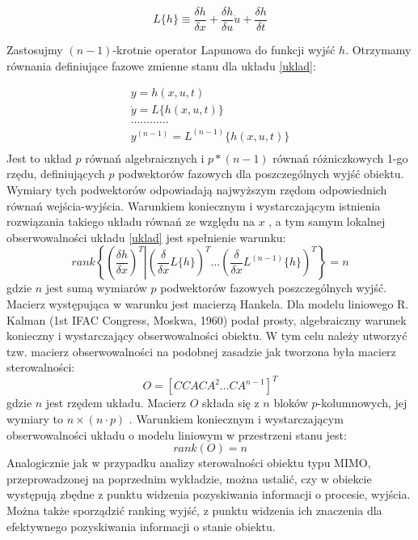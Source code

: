 \documentclass{article}
\begin{document}
		\begin{equation}
			L\{h\} \equiv \frac{\delta h}{\delta x} + \frac{\delta h}{\delta u} \dot{u} + \frac{\delta h}{\delta t}
		\end{equation}

		Zastosujmy $(n-1)$-krotnie operator Lapunowa do funkcji wyjść $h$.
		Otrzymamy równania definiujące fazowe zmienne stanu dla układu \ref{uklad}:

		\begin{align*}
			y = h(x,u,t) \\ 
			\dot{y} = L\{h(x,u,t)\} \\ 
			\ldots \ldots \ldots \ldots \\
			y^{(n-1)} = L^{(n-1)}\{h(x,u,t)\} \\ 
		\end{align*}
		Jest to układ $p$ równań algebraicznych i $p*(n-1)$ równań różniczkowych 1-go rzędu,
		definiujących $p$ podwektorów fazowych dla poszczególnych wyjść obiektu. Wymiary tych
		podwektorów odpowiadają najwyższym rzędom odpowiednich równań wejścia-wyjścia.
		Warunkiem koniecznym i wystarczającym istnienia rozwiązania takiego układu równań
		ze względu na $x$ , a tym samym lokalnej obserwowalności układu \eqref{uklad} jest spełnienie
		warunku:
		\begin{equation}
			rank  \left\{ \left(
			 \left. \frac{\delta h}{\delta x} \right)^T
			 \right\vert
			 \left( \frac{\delta }{\delta x} L\{h\} \right)^T 
			 \ldots 
			 \left( \frac{\delta }{\delta x} L^{(n-1)}\{h\} \right)^T
			 \right\} = n
		\end{equation}
		gdzie $n$ jest sumą wymiarów $p$ podwektorów fazowych poszczególnych wyjść. Macierz
		występująca w warunku jest macierzą Hankela.
		Dla modelu liniowego R. Kalman (1st IFAC Congress, Moskwa, 1960) podał prosty,
		algebraiczny warunek konieczny i wystarczający obserwowalności obiektu.
		W tym celu należy utworzyć tzw. macierz obserwowalności na podobnej zasadzie jak
		tworzona była macierz sterowalności:
		\begin{equation}
			O = [ C CA CA^2 \ldots CA^{n-1}]^T
		\end{equation}
		gdzie $n$ jest rzędem układu. Macierz $O$ składa się z $n$
		bloków $p$-kolumnowych, jej wymiary to $n \times (n \cdot p)$ .
		Warunkiem koniecznym i wystarczającym obserwowalności układu o modelu liniowym
		w przestrzeni stanu jest:
		\begin{equation}
			rank(O) = n
		\end{equation}
		Analogicznie jak w przypadku analizy sterowalności obiektu typu MIMO,
		przeprowadzonej na poprzednim wykładzie, można ustalić, czy w obiekcie występują
		zbędne z punktu widzenia pozyskiwania informacji o procesie, wyjścia. Można także
		sporządzić ranking wyjść, z punktu widzenia ich znaczenia dla efektywnego
		pozyskiwania informacji o stanie obiektu.
\end{document}
